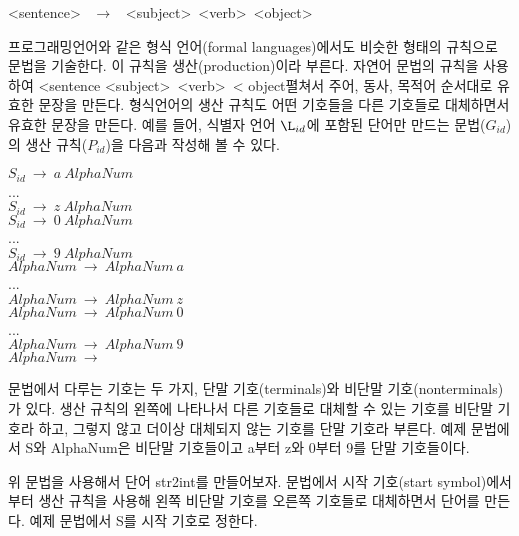 \documentclass[a4paper]{book}
\begin{document}
\begin{center}
  \textless sentence\textgreater
  \ $\rightarrow$ \ 
  \textless subject\textgreater \ 
  \textless verb\textgreater \ 
  \textless object\textgreater
\end{center}

프로그래밍언어와 같은 형식 언어(formal languages)에서도 비슷한 형태의
규칙으로 문법을 기술한다. 이 규칙을 생산(production)이라
부른다.
%
자연어 문법의 규칙을 사용하여 \textless sentence
\textless subject\textgreater \ \textless verb\textgreater \ \textless
object 펼쳐서 주어, 동사, 목적어 순서대로 유효한 문장을
만든다.
%  
형식언어의 생산 규칙도 어떤 기호들을 다른 기호들로 대체하면서 유효한
문장을 만든다.
%
예를 들어, 식별자 언어 $\L_{id}$에 포함된 단어만 만드는 문법($G_{id}$)의 생산
규칙($P_{id}$)을 다음과 작성해 볼 수 있다.
\begin{center}
  $S_{id} \ \rightarrow \ a \ AlphaNum$ \\
  ... \\
  $S_{id} \ \rightarrow \ z \ AlphaNum$ \\
  $S_{id} \ \rightarrow \ 0 \ AlphaNum$ \\
  ... \\
  $S_{id} \ \rightarrow \ 9 \ AlphaNum$ \\
  $AlphaNum \ \rightarrow \ AlphaNum \ a$ \\
  ... \\
  $AlphaNum \ \rightarrow \ AlphaNum \ z$ \\
  $AlphaNum \ \rightarrow \ AlphaNum \ 0$ \\
  ... \\
  $AlphaNum \ \rightarrow \ AlphaNum \ 9$ \\
  $AlphaNum \ \rightarrow \ $
\end{center}


문법에서 다루는 기호는 두 가지, 단말 기호(terminals)와 비단말
기호(nonterminals)가 있다.  생산 규칙의 왼쪽에 나타나서 다른 기호들로
대체할 수 있는 기호를 비단말 기호라 하고, 그렇지 않고 더이상 대체되지
않는 기호를 단말 기호라 부른다.  예제 문법에서 S와 AlphaNum은 비단말
기호들이고 a부터 z와 0부터 9를 단말 기호들이다.

위 문법을 사용해서 단어 str2int를 만들어보자. 문법에서 시작 기호(start
symbol)에서부터 생산 규칙을 사용해 왼쪽 비단말 기호를 오른쪽 기호들로
대체하면서 단어를 만든다. 예제 문법에서 S를 시작 기호로 정한다.
\end{document}
